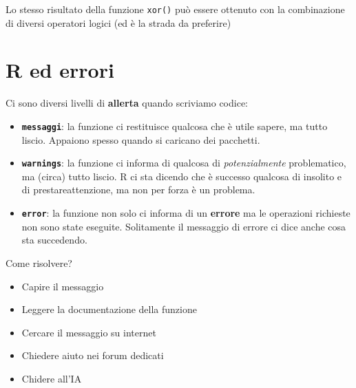 \documentclass[
  a4paper,
  DIV=11,
  numbers=noendperiod]{scrreprt}
\providecommand{\tightlist}{%
  \setlength{\itemsep}{0pt}\setlength{\parskip}{0pt}}
\begin{document}
\begin{table}
\begin{minipage}{0.50\linewidth}


\end{minipage}%

\end{table}%

Lo stesso risultato della funzione \texttt{xor()} può essere ottenuto
con la combinazione di diversi operatori logici (ed è la strada da
preferire)

\section{R ed errori}\label{r-ed-errori}

Ci sono diversi livelli di \textbf{allerta} quando scriviamo codice:

\begin{itemize}
\item
  \textbf{\texttt{messaggi}}: la funzione ci restituisce qualcosa che è
  utile sapere, ma tutto liscio. Appaiono spesso quando si caricano dei
  pacchetti.
\item
  \textbf{\texttt{warnings}}: la funzione ci informa di qualcosa di
  \emph{potenzialmente} problematico, ma (circa) tutto liscio. R ci sta
  dicendo che è successo qualcosa di insolito e di prestareattenzione,
  ma non per forza è un problema.
\item
  \textbf{\texttt{error}}: la funzione non solo ci informa di un
  \textbf{errore} ma le operazioni richieste non sono state eseguite.
  Solitamente il messaggio di errore ci dice anche cosa sta succedendo.
\end{itemize}

Come risolvere?

\begin{itemize}
\tightlist
\item
  Capire il messaggio
\item
  Leggere la documentazione della funzione
\item
  Cercare il messaggio su internet
\item
  Chiedere aiuto nei forum dedicati
\item
  Chidere all'IA
\end{itemize}
\end{document}
